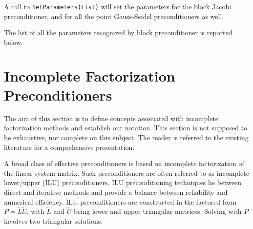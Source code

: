 A call to \verb!SetParameters(List)! will set the parameters for the block
Jacobi preconditioner, and for all the point Gauss-Seidel preconditioners as
well.

\medskip

The list of all the parameters recognized by block preconditioner is reported
below.

\medskip





\section{Incomplete Factorization Preconditioners}
\label{sec:ilu}

The aim of this section is to define concepts associated with incomplete
factorization methods and establish our notation. This section is not
supposed to be exhaustive, nor complete on this subject. The reader is
referred to the existing literature for a comprehensive presentation.

\medskip

A broad class of effective preconditioners is based on incomplete
factorization of the linear system matrix.  Such preconditioners are often
referred to as incomplete lower/upper (ILU) preconditioners.  
ILU preconditioning techniques lie between direct and
iterative methods and provide a balance between reliability and
numerical efficiency.  ILU preconditioners are constructed in the factored form
$P=\tilde{L} \tilde{U}$, with $\tilde{L}$ and $\tilde{U}$ being lower
and upper triangular matrices. Solving with $P$ involves two triangular
solutions.

